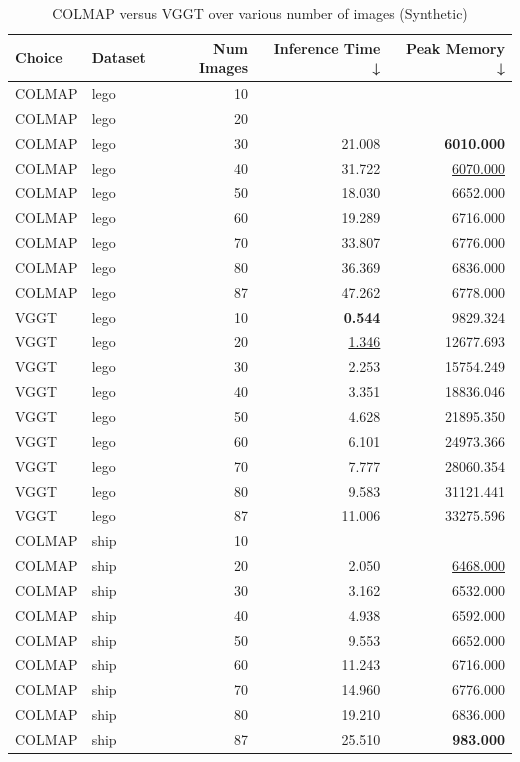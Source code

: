 \begin{table}[H]
\caption{\ifdefined\customcaption \customcaption \else COLMAP versus VGGT over various number of images (Synthetic) \fi}
\label{tab:01_num_images_timing_synthetic}
\centering
\scriptsize
\begin{tabular}{llrrr}
\toprule
Choice & Dataset & Num Images & Inference Time ↓ & Peak Memory ↓ \\
\midrule
COLMAP & lego & 10 &  &  \\
COLMAP & lego & 20 &  &  \\
COLMAP & lego & 30 & 21.008 & \textbf{6010.000} \\
COLMAP & lego & 40 & 31.722 & \underline{6070.000} \\
COLMAP & lego & 50 & 18.030 & 6652.000 \\
COLMAP & lego & 60 & 19.289 & 6716.000 \\
COLMAP & lego & 70 & 33.807 & 6776.000 \\
COLMAP & lego & 80 & 36.369 & 6836.000 \\
COLMAP & lego & 87 & 47.262 & 6778.000 \\
VGGT & lego & 10 & \textbf{0.544} & 9829.324 \\
VGGT & lego & 20 & \underline{1.346} & 12677.693 \\
VGGT & lego & 30 & 2.253 & 15754.249 \\
VGGT & lego & 40 & 3.351 & 18836.046 \\
VGGT & lego & 50 & 4.628 & 21895.350 \\
VGGT & lego & 60 & 6.101 & 24973.366 \\
VGGT & lego & 70 & 7.777 & 28060.354 \\
VGGT & lego & 80 & 9.583 & 31121.441 \\
VGGT & lego & 87 & 11.006 & 33275.596 \\
\midrule
COLMAP & ship & 10 &  &  \\
COLMAP & ship & 20 & 2.050 & \underline{6468.000} \\
COLMAP & ship & 30 & 3.162 & 6532.000 \\
COLMAP & ship & 40 & 4.938 & 6592.000 \\
COLMAP & ship & 50 & 9.553 & 6652.000 \\
COLMAP & ship & 60 & 11.243 & 6716.000 \\
COLMAP & ship & 70 & 14.960 & 6776.000 \\
COLMAP & ship & 80 & 19.210 & 6836.000 \\
COLMAP & ship & 87 & 25.510 & \textbf{983.000} \\

\end{tabular}
\end{table}
